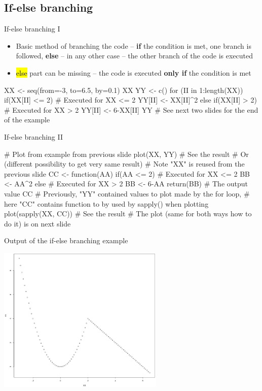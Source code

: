 \documentclass[compress, ucs, xelatex, 11pt, xcolor=svgnames,
  hyperref={
    bookmarks=true,
    unicode=true,
    colorlinks=true,
    pdftitle={Molecular data in R},
    plainpages=false,
    pdfauthor={Vojtech Zeisek},
    pdfsubject={Course about phylogeny and evolution in R},
    pdfcreator={XeLaTeX},
    pdfkeywords={R, evolution, phylogeny, molecular data},
    linkcolor=Tomato,
    anchorcolor=SaddleBrown,
    citecolor=Goldenrod,
    filecolor=DarkMagenta,
    menucolor=Sienna,
    urlcolor=DarkTurquoise,
    pdftex},
  url={hyphens, lowtilde} %
  ]{beamer}
\renewcommand{\texttt}[1]{\hl{\ttfamily #1}}
\begin{document}
\subsection{If-else branching}

\begin{frame}[fragile]{If-else branching I}
  \begin{itemize}
    \item Basic method of branching the code -- \textbf{if} the condition is met, one branch is followed, \textbf{else} -- in any other case -- the other branch of the code is executed
    \item \texttt{else} part can be missing -- the code is executed \textbf{only if} the condition is met
  \end{itemize}
  \begin{spluscode}
    XX <- seq(from=-3, to=6.5, by=0.1)
    XX
    YY <- c()
    for (II in 1:length(XX)) {
      if(XX[II] <= 2) { # Executed for XX <= 2
        YY[II] <- XX[II]^2
        } else if(XX[II] > 2) { # Executed for XX > 2
          YY[II] <- 6-XX[II]
          }
      }
    YY # See next two slides for the end of the example
  \end{spluscode}
\end{frame}

\begin{frame}[fragile]{If-else branching II}
  \begin{spluscode}
    # Plot from example from previous slide
    plot(XX, YY) # See the result
    # Or (different possibility to get very same result)
    # Note "XX" is reused from the previous slide
    CC <- function(AA) {
      if(AA <= 2) { # Executed for XX <= 2
        BB <- AA^2
      } else { # Executed for XX > 2
        BB <- 6-AA
        }
      return(BB) # The output value
      }
     CC # Previously, "YY" contained values to plot made by the for loop,
        # here "CC" contains function to by used by sapply() when plotting
     plot(sapply(XX, CC)) # See the result
    # The plot (same for both ways how to do it) is on next slide
  \end{spluscode}
\end{frame}

\begin{frame}{Output of the if-else branching example}
  \begin{center}
    \includegraphics[height=7cm]{if-else.png}
  \end{center}
\end{frame}
\end{document}
